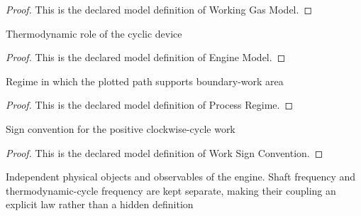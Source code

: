 \begin{proof}
  This is the declared model definition of Working Gas Model.
\end{proof}
\begin{definition}
  \label{def:physics:phyx-mini-0426:phyxminiproblems-problemphyxmini0426-enginemodel}
  Thermodynamic role of the cyclic device
\end{definition}
\begin{proof}
  This is the declared model definition of Engine Model.
\end{proof}
\begin{definition}
  \label{def:physics:phyx-mini-0426:phyxminiproblems-problemphyxmini0426-processregime}
  Regime in which the plotted path supports boundary-work area
\end{definition}
\begin{proof}
  This is the declared model definition of Process Regime.
\end{proof}
\begin{definition}
  \label{def:physics:phyx-mini-0426:phyxminiproblems-problemphyxmini0426-worksignconvention}
  Sign convention for the positive clockwise-cycle work
\end{definition}
\begin{proof}
  This is the declared model definition of Work Sign Convention.
\end{proof}
\begin{definition}
  \label{def:physics:phyx-mini-0426:phyxminiproblems-problemphyxmini0426-diatomicheatenginesetup}
  Independent physical objects and observables of the engine. Shaft frequency and thermodynamic-cycle frequency are kept separate, making their coupling an explicit law rather than a hidden definition
\end{definition}
